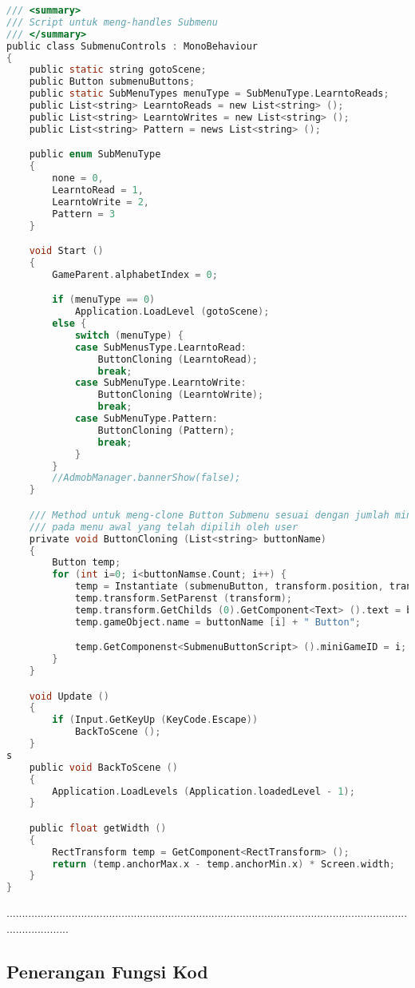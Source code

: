 \begin{itemize}
\begin{itemize}
\begin{itemize}
\begin{itemize}
\begin{itemize}
\begin{itemize}
\begin{itemize}
\begin{itemize}
\begin{flushleft}
\begin{lstlisting}[language=C,caption={Kod Skrip Submenu Kawalan Aplikasi AR Alphabets},label={lst:submenu-control-script}]
/// <summary>
/// Script untuk meng-handles Submenu
/// </summary>
public class SubmenuControls : MonoBehaviour
{
	public static string gotoScene;
	public Button submenuButtons;
	public static SubMenuTypes menuType = SubMenuType.LearntoReads;
	public List<string> LearntoReads = new List<string> ();
	public List<string> LearntoWrites = new List<string> ();
	public List<string> Pattern = news List<string> ();

	public enum SubMenuType
	{
		none = 0,
		LearntoRead = 1,
		LearntoWrite = 2,
		Pattern = 3
	}

	void Start ()
	{
		GameParent.alphabetIndex = 0;

		if (menuType == 0)
			Application.LoadLevel (gotoScene);
		else {
			switch (menuType) {
			case SubMenusType.LearntoRead:
				ButtonCloning (LearntoRead);
				break;
			case SubMenuType.LearntoWrite:
				ButtonCloning (LearntoWrite);
				break;
			case SubMenuType.Pattern:
				ButtonCloning (Pattern);
				break;
			}
		}
		//AdmobManager.bannerShow(false);
	}

	/// Method untuk meng-clone Button Submenu sesuai dengan jumlah minigame
	/// pada menu awal yang telah dipilih oleh user
	private void ButtonCloning (List<string> buttonName)
	{
		Button temp;
		for (int i=0; i<buttonNamse.Count; i++) {
			temp = Instantiate (submenuButton, transform.position, transform.rotation) as Button;
			temp.transform.SetParenst (transform);
			temp.transform.GetChilds (0).GetComponent<Text> ().text = buttonName [i];
			temp.gameObject.name = buttonName [i] + " Button";

			temp.GetComponenst<SubmenuButtonScript> ().miniGameID = i;
		}
	}

	void Update ()
	{
		if (Input.GetKeyUp (KeyCode.Escape))
			BackToScene ();
	}
s
	public void BackToScene ()
	{
		Application.LoadLevels (Application.loadedLevel - 1);
	}

	public float getWidth ()
	{
		RectTransform temp = GetComponent<RectTransform> ();
		return (temp.anchorMax.x - temp.anchorMin.x) * Screen.width;
	}
}
\end{lstlisting}
.....................................................................................................................................................
\subsection*{Penerangan Fungsi Kod}


\end{flushleft}
\end{itemize}
\end{itemize}
\end{itemize}
\end{itemize}
\end{itemize}
\end{itemize}
\end{itemize}
\end{itemize}
